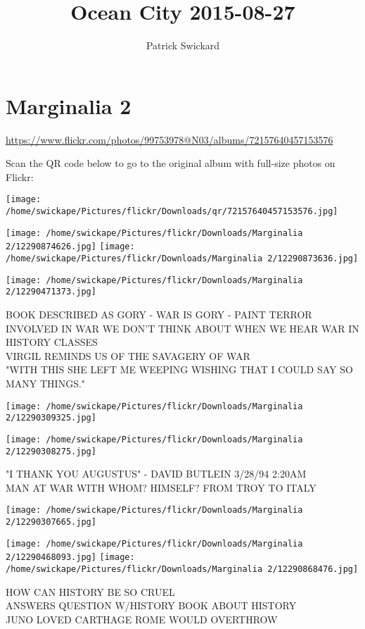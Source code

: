 \documentclass[10pt,letterpaper]{article}
\title{Ocean City 2015-08-27}
\author{Patrick Swickard}
\date{}
\begin{document}
\section*{Marginalia 2}

\url{https://www.flickr.com/photos/99753978@N03/albums/72157640457153576}

Scan the QR code below to go to the original album with full-size photos on Flickr:

\texttt{[image: /home/swickape/Pictures/flickr/Downloads/qr/72157640457153576.jpg]}
\pagebreak

\texttt{[image: /home/swickape/Pictures/flickr/Downloads/Marginalia 2/12290874626.jpg]}
\texttt{[image: /home/swickape/Pictures/flickr/Downloads/Marginalia 2/12290873636.jpg]}

\vspace{0.25in}
\texttt{[image: /home/swickape/Pictures/flickr/Downloads/Marginalia 2/12290471373.jpg]}

BOOK DESCRIBED AS GORY {-} WAR IS GORY {-} PAINT TERROR INVOLVED IN WAR WE DON'T THINK ABOUT WHEN WE HEAR WAR IN HISTORY CLASSES\\
VIRGIL REMINDS US OF THE SAVAGERY OF WAR\\
"WITH THIS SHE LEFT ME WEEPING WISHING THAT I COULD SAY SO MANY THINGS."
\pagebreak

\texttt{[image: /home/swickape/Pictures/flickr/Downloads/Marginalia 2/12290309325.jpg]}

\vspace{0.25in}
\texttt{[image: /home/swickape/Pictures/flickr/Downloads/Marginalia 2/12290308275.jpg]}

"I THANK YOU AUGUSTUS" {-} DAVID BUTLEIN 3/28/94 2:20AM\\
MAN AT WAR WITH WHOM? HIMSELF? FROM TROY TO ITALY
\pagebreak

\texttt{[image: /home/swickape/Pictures/flickr/Downloads/Marginalia 2/12290307665.jpg]}

\vspace{0.25in}
\texttt{[image: /home/swickape/Pictures/flickr/Downloads/Marginalia 2/12290468093.jpg]}
\texttt{[image: /home/swickape/Pictures/flickr/Downloads/Marginalia 2/12290868476.jpg]}

HOW CAN HISTORY BE SO CRUEL\\
ANSWERS QUESTION W/HISTORY BOOK ABOUT HISTORY\\
JUNO LOVED CARTHAGE ROME WOULD OVERTHROW
\pagebreak
\end{document}

